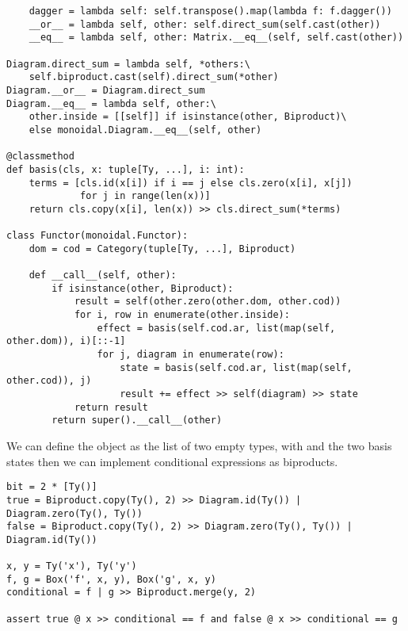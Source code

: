 \begin{python}
\begin{verbatim}
    dagger = lambda self: self.transpose().map(lambda f: f.dagger())
    __or__ = lambda self, other: self.direct_sum(self.cast(other))
    __eq__ = lambda self, other: Matrix.__eq__(self, self.cast(other))

Diagram.direct_sum = lambda self, *others:\
    self.biproduct.cast(self).direct_sum(*other)
Diagram.__or__ = Diagram.direct_sum
Diagram.__eq__ = lambda self, other:\
    other.inside = [[self]] if isinstance(other, Biproduct)\
    else monoidal.Diagram.__eq__(self, other)

@classmethod
def basis(cls, x: tuple[Ty, ...], i: int):
    terms = [cls.id(x[i]) if i == j else cls.zero(x[i], x[j])
             for j in range(len(x))]
    return cls.copy(x[i], len(x)) >> cls.direct_sum(*terms)

class Functor(monoidal.Functor):
    dom = cod = Category(tuple[Ty, ...], Biproduct)

    def __call__(self, other):
        if isinstance(other, Biproduct):
            result = self(other.zero(other.dom, other.cod))
            for i, row in enumerate(other.inside):
                effect = basis(self.cod.ar, list(map(self, other.dom)), i)[::-1]
                for j, diagram in enumerate(row):
                    state = basis(self.cod.ar, list(map(self, other.cod)), j)
                    result += effect >> self(diagram) >> state
            return result
        return super().__call__(other)
\end{verbatim}
\end{python}

\begin{example}
We can define the object  as the list of two empty types, with  and  the two basis states
then we can implement conditional expressions as biproducts.

\begin{verbatim}
bit = 2 * [Ty()]
true = Biproduct.copy(Ty(), 2) >> Diagram.id(Ty()) | Diagram.zero(Ty(), Ty())
false = Biproduct.copy(Ty(), 2) >> Diagram.zero(Ty(), Ty()) | Diagram.id(Ty())

x, y = Ty('x'), Ty('y')
f, g = Box('f', x, y), Box('g', x, y)
conditional = f | g >> Biproduct.merge(y, 2)

assert true @ x >> conditional == f and false @ x >> conditional == g
\end{verbatim}
\end{example}

